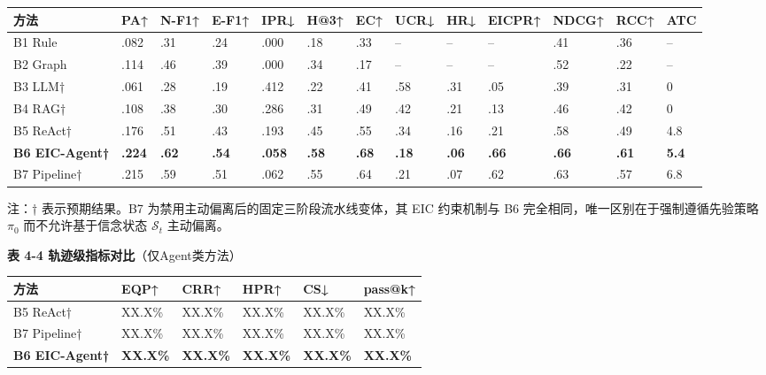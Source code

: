 \documentclass[a4paper,12pt]{ctexart}
\begin{document}
\begin{table}[htbp]
\centering
\small
\setlength{\tabcolsep}{4pt}
\begin{tabular}{|l|l|l|l|l|l|l|l|l|l|l|l|l|}
\hline
\textbf{方法} & \textbf{PA↑} & \textbf{N-F1↑} & \textbf{E-F1↑} & \textbf{IPR↓} & \textbf{H@3↑} & \textbf{EC↑} & \textbf{UCR↓} & \textbf{HR↓} & \textbf{EICPR↑} & \textbf{NDCG↑} & \textbf{RCC↑} & \textbf{ATC} \\
\hline
B1 Rule & .082 & .31 & .24 & .000 & .18 & .33 & – & – & – & .41 & .36 & – \\
\hline
B2 Graph & .114 & .46 & .39 & .000 & .34 & .17 & – & – & – & .52 & .22 & – \\
\hline
B3 LLM† & .061 & .28 & .19 & .412 & .22 & .41 & .58 & .31 & .05 & .39 & .31 & 0 \\
\hline
B4 RAG† & .108 & .38 & .30 & .286 & .31 & .49 & .42 & .21 & .13 & .46 & .42 & 0 \\
\hline
B5 ReAct† & .176 & .51 & .43 & .193 & .45 & .55 & .34 & .16 & .21 & .58 & .49 & 4.8 \\
\hline
\textbf{B6 EIC-Agent†} & \textbf{.224} & \textbf{.62} & \textbf{.54} & \textbf{.058} & \textbf{.58} & \textbf{.68} & \textbf{.18} & \textbf{.06} & \textbf{.66} & \textbf{.66} & \textbf{.61} & \textbf{5.4} \\
\hline
B7 Pipeline† & .215 & .59 & .51 & .062 & .55 & .64 & .21 & .07 & .62 & .63 & .57 & 6.8 \\
\hline
\end{tabular}
\end{table}

注：† 表示预期结果。B7 为禁用主动偏离后的固定三阶段流水线变体，其 EIC 约束机制与 B6 完全相同，唯一区别在于强制遵循先验策略 $\pi_0$ 而不允许基于信念状态 $\mathcal{S}_t$ 主动偏离。

\textbf{表 4-4 轨迹级指标对比}（仅Agent类方法）

\begin{table}[htbp]
\centering
\small
\setlength{\tabcolsep}{4pt}
\begin{tabular}{|l|l|l|l|l|l|}
\hline
\textbf{方法} & \textbf{EQP↑} & \textbf{CRR↑} & \textbf{HPR↑} & \textbf{CS↓} & \textbf{pass@k↑} \\
\hline
B5 ReAct† & XX.X\% & XX.X\% & XX.X\% & XX.X\% & XX.X\% \\
\hline
B7 Pipeline† & XX.X\% & XX.X\% & XX.X\% & XX.X\% & XX.X\% \\
\hline
\textbf{B6 EIC-Agent†} & \textbf{XX.X\%} & \textbf{XX.X\%} & \textbf{XX.X\%} & \textbf{XX.X\%} & \textbf{XX.X\%} \\
\hline
\end{tabular}
\end{table}
\end{document}
